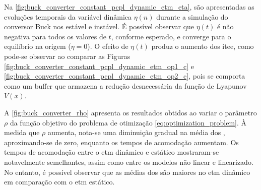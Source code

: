 Na \autoref{fig:buck_converter_constant_pcpl_dynamic_etm_eta}, são apresentadas as evoluções temporais da variável dinâmica $\eta(n)$ durante a simulação do conversor Buck nos  estável e instável. É possível observar que $\eta(t)$ é não negativa para todos os valores de $t$, conforme esperado, e converge para o equilíbrio na origem ($\eta = 0$). O efeito de $\eta(t)$ produz o aumento dos \acrshort{itee}, como pode-se observar ao comparar as Figuras \ref{fig:buck_converter_constant_pcpl_dynamic_etm_op1_c} e \ref{fig:buck_converter_constant_pcpl_dynamic_etm_op2_c}, pois se comporta como um buffer que armazena a redução desnecessária da função de Lyapunov $V(x)$.


A \autoref{fig:buck_converter_rho} apresenta os resultados obtidos ao variar o parâmetro $\rho$ da função objetivo do problema de otimização \eqref{eq:optimization_problem}. À medida que $\rho$ aumenta, nota-se uma diminuição gradual na média dos , aproximando-se de zero, enquanto os tempos de acomodação aumentam. Os tempos de acomodação entre o \acrshort{etm} dinâmico e estático mostraram-se notavelmente semelhantes, assim como entre os modelos não linear e linearizado. No entanto, é possível observar que as médias dos  são maiores no \acrshort{etm} dinâmico em comparação com o \acrshort{etm} estático.

